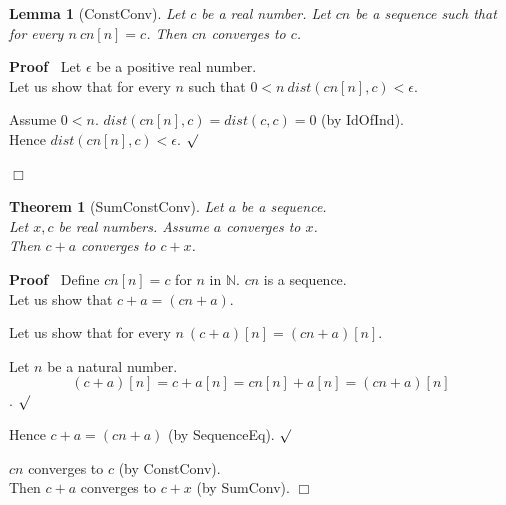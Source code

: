 \documentclass{article}
\newenvironment{forthel}{\begin{leftbar}}{\end{leftbar}}
\newenvironment{proof}{\noindent\textbf{Proof\ }}{\hspace*{\fill}$\Box$\medskip}
\newenvironment{subproof}{\begin{list}{}{}
		\item[\text{Proof}]}{\hfill $\surd$ \end{list}}
\newtheorem{lemma}{Lemma}
\newtheorem{theorem}{Theorem}
\newcommand{\NN}{\mathbb{N}}
\newcommand{\plusone}{+}
\newcommand{\plustwo}{+}
\newcommand{\dotequal}{=}
\begin{document}
\begin{forthel}
	\begin{lemma}[ConstConv]
	Let $c$ be a real number. Let $cn$ be a sequence such that for every $n \ cn[n] = c$.
	Then $cn$ converges to $c$.
	\end{lemma}
	\begin{proof}
	Let $\epsilon$ be a positive real number.
	\\Let us show that for every $n$ such that $0 < n \ dist(cn[n],c) < \epsilon$.
	\begin{subproof}
	Assume $0 < n$.
	$dist(cn[n],c) = dist(c,c) = 0$ (by IdOfInd).
	\\Hence $dist(cn[n],c) < \epsilon$.
	\end{subproof}
	\end{proof}
	
	\begin{theorem}[SumConstConv]
	Let $a$ be a sequence. \\Let $x,c$ be real numbers. Assume $a$ converges to $x$.
	\\Then $c \plustwo a$ converges to $c + x$.
	\end{theorem}
	\begin{proof}
	Define $cn[n] = c$ for $n$ in $\NN$.
	$cn$ is a sequence.
	\\Let us show that $c \plustwo a = (cn \plusone a)$.
	\begin{subproof}
	Let us show that for every $n \ (c \plustwo a)[n] = (cn \plusone a)[n]$.
	\begin{subproof}
	Let $n$ be a natural number.
	$$(c \plustwo a)[n] \dotequal c + a[n]
	\dotequal cn[n] + a[n]
	\dotequal (cn \plusone a)[n]$$.
	\end{subproof}
	Hence $c \plustwo a = (cn \plusone a)$ (by SequenceEq).
	\end{subproof}
	$cn$ converges to $c$ (by ConstConv).
	\\Then $c \plustwo a$ converges to $c + x$ (by SumConv).
	\end{proof}
	

\end{forthel}
\end{document}
